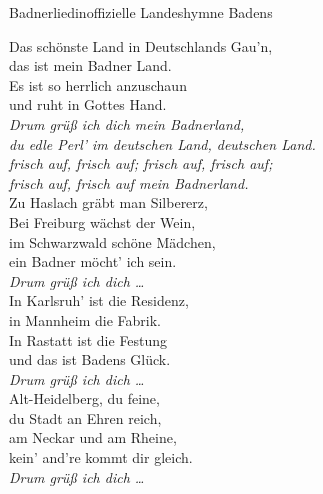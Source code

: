
\begin{lied**}{Badnerlied}{inoffizielle Landeshymne Badens}

Das schönste Land in Deutschlands Gau’n,\\
das ist mein Badner Land.\\
Es ist so herrlich anzuschaun\\
und ruht in Gottes Hand.\\

\textit{Drum grüß ich dich mein Badnerland,\\
du edle Perl’ im deutschen Land, deutschen Land.\\
frisch auf, frisch auf; frisch auf, frisch auf;\\
frisch auf, frisch auf mein Badnerland.}\\

Zu Haslach gräbt man Silbererz,\\
Bei Freiburg wächst der Wein,\\
im Schwarzwald schöne Mädchen,\\
ein Badner möcht’ ich sein.\\

\textit{Drum grüß ich dich …}\\

In Karlsruh’ ist die Residenz,\\
in Mannheim die Fabrik.\\
In Rastatt ist die Festung\\
und das ist Badens Glück.\\

\textit{Drum grüß ich dich …}\\

Alt-Heidelberg, du feine,\\
du Stadt an Ehren reich,\\
am Neckar und am Rheine,\\
kein’ and’re kommt dir gleich.\\

\textit{Drum grüß ich dich …}\end{lied**}